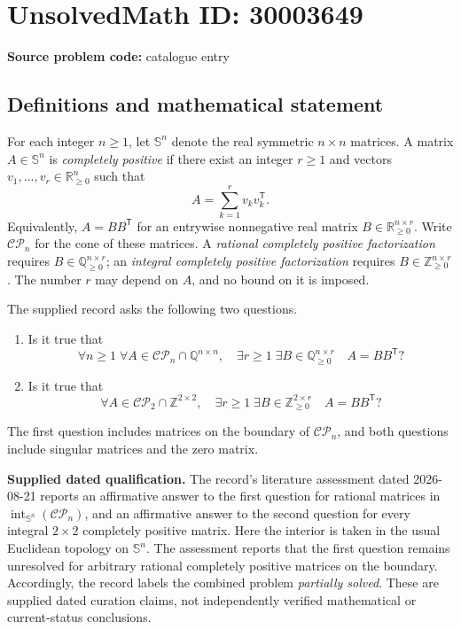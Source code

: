 \documentclass[11pt]{article}
\newcommand{\Z}{\mathbb{Z}}
\newcommand{\Q}{\mathbb{Q}}
\newcommand{\R}{\mathbb{R}}
\begin{document}
\section*{UnsolvedMath ID: 30003649}
\textbf{Source problem code:} catalogue entry
\subsection{Definitions and mathematical statement}
For each integer \(n\geq 1\), let \(\mathbb S^n\) denote the real symmetric \(n\times n\) matrices. A matrix \(A\in\mathbb S^n\) is \emph{completely positive} if there exist an integer \(r\geq 1\) and vectors \(v_1,\ldots,v_r\in\R_{\geq 0}^n\) such that
\[
A=\sum_{k=1}^{r}v_kv_k^{\mathsf T}.
\]
Equivalently, \(A=BB^{\mathsf T}\) for an entrywise nonnegative real matrix \(B\in\R_{\geq 0}^{n\times r}\). Write \(\mathcal{CP}_n\) for the cone of these matrices. A \emph{rational completely positive factorization} requires \(B\in\Q_{\geq 0}^{n\times r}\); an \emph{integral completely positive factorization} requires \(B\in\Z_{\geq 0}^{n\times r}\). The number \(r\) may depend on \(A\), and no bound on it is imposed.

The supplied record asks the following two questions.
\begin{enumerate}
\item Is it true that
\[
\forall n\geq 1\;\forall A\in\mathcal{CP}_n\cap\Q^{n\times n},\quad
\exists r\geq 1\;\exists B\in\Q_{\geq 0}^{n\times r}
\quad A=BB^{\mathsf T}?
\]
\item Is it true that
\[
\forall A\in\mathcal{CP}_2\cap\Z^{2\times 2},\quad
\exists r\geq 1\;\exists B\in\Z_{\geq 0}^{2\times r}
\quad A=BB^{\mathsf T}?
\]
\end{enumerate}
The first question includes matrices on the boundary of \(\mathcal{CP}_n\), and both questions include singular matrices and the zero matrix.

\textbf{Supplied dated qualification.} The record's literature assessment dated 2026-08-21 reports an affirmative answer to the first question for rational matrices in \(\operatorname{int}_{\mathbb S^n}(\mathcal{CP}_n)\), and an affirmative answer to the second question for every integral \(2\times 2\) completely positive matrix. Here the interior is taken in the usual Euclidean topology on \(\mathbb S^n\). The assessment reports that the first question remains unresolved for arbitrary rational completely positive matrices on the boundary. Accordingly, the record labels the combined problem \emph{partially solved}. These are supplied dated curation claims, not independently verified mathematical or current-status conclusions.
\end{document}

